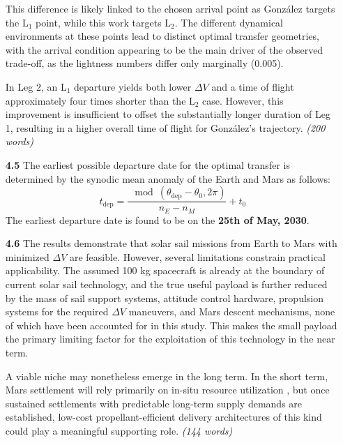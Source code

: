 \documentclass[a4paper,12pt]{article}
\begin{document}
\begin{enumerate}
    This difference is likely linked to the chosen arrival point as González targets the L$_1$ point, while this work targets L$_2$. The different dynamical 
    environments at these points lead to distinct optimal transfer geometries, with the arrival condition appearing to be the main driver of the observed trade-off, as
    the lightness numbers differ only marginally (0.005).

    In Leg 2, an L$_1$ departure yields both lower $\Delta V$ and a time of flight approximately four times shorter than the L$_2$ case. However, this improvement 
    is insufficient to offset the substantially longer duration of Leg 1, resulting in a higher overall time of flight for González's trajectory. \textit{(200 words)}

    \item[\textbf{4.5}] The earliest possible departure date for the optimal transfer is determined by the synodic mean anomaly of the Earth and Mars as follows:
    \begin{equation}
        t_{\text{dep}} = \frac{\mod(\theta_\text{dep} - \theta_0, 2\pi)}{n_E - n_M} + t_0
    \end{equation}
    The earliest departure date is found to be on the \textbf{25th of May, 2030}.
    
    \item[\textbf{4.6}] The results demonstrate that solar sail missions from Earth to Mars with minimized $\Delta V$ are feasible. However, several limitations
    constrain practical applicability. The assumed 100 kg spacecraft is already at the boundary of current solar sail technology, and the true useful payload 
    is further reduced by the mass of sail support systems, attitude control hardware, propulsion systems for the required $\Delta V$ maneuvers, and Mars
    descent mechanisms, none of which have been accounted for in this study. This makes the small payload the primary limiting factor for the exploitation of 
    this technology in the near term.
    
    A viable niche may nonetheless emerge in the long term. In the short term, Mars settlement will rely primarily on in-situ resource utilization 
    \cite{zamani2024feasibility}, but once sustained settlements with predictable long-term supply demands are established, low-cost propellant-efficient 
    delivery architectures of this kind could play a meaningful supporting role. \textit{(144 words)}

\end{enumerate}
\end{document}
